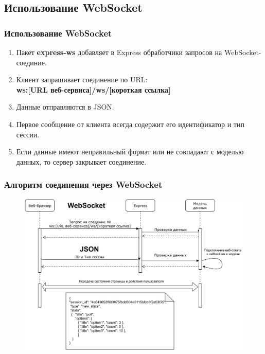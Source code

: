 \documentclass{beamer}
\begin{document}
\subsection{Использование WebSocket}
\begin{frame}
\frametitle{Использование WebSocket}
	\begin{enumerate}
		\item Пакет \textbf{express-ws} добавляет в Express обработчики запросов на WebSocket-соединие.
		\item Клиент запрашивает соединение по URL:\\ \textbf{ws:[URL веб-сервиса]/ws/[короткая ссылка]}	  
		\item Данные отправляются в JSON. 
		\item Первое сообщение от клиента всегда содержит его идентификатор и тип сессии. 
		\item Если данные имеют неправильный формат или не совпадают с моделью данных, то сервер закрывает соединение.
	\end{enumerate}
\end{frame}

\begin{frame}
\frametitle{Алгоритм соединения через WebSocket}
\begin{figure}
	\includegraphics[width=\linewidth]{img/wsdiagram.png}
\end{figure}
\end{frame}
\end{document}
